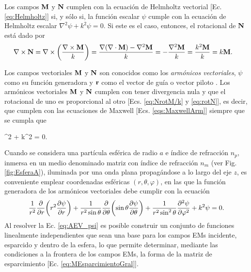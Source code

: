 Los campos $\vb{M}$ y $\vb{N}$ cumplen con la  ecuación de Helmholtz vectorial [Ec. \eqref{eq:Helmholtz}] si, y sólo si, la función escalar $\psi$ cumple con la ecuación de Helmholtz escalar $\nabla^2 \psi + k^2 \psi = 0$. Si este es el caso, entonces, el rotacional de $\vb{N}$ está dado por
	\begin{align}
	\nabla\times \vb{N} &= \nabla\times \qty(\frac{\nabla\times \vb{M}}{k})  
						= \frac{\nabla\qty(\nabla\cdot\vb{M})-\nabla^2\vb{M}}{k}
						= - \frac{\nabla^2 \vb{M}}{k}
						= \frac{k^2 \vb{M}}{k}
						= k \vb{M}.\label{eq:rotN}
	\end{align}\vspace*{-1em}
	
Los campos vectoriales $\vb{M}$ y $\vb{N}$ son conocidos como los \emph{armónicos  vectoriales}, $\psi$ como su función generadora y $\vb{r}$ como el vector de guía o vector piloto \cite{bohren1998absorption}. Los armónicos vectoriales $\vb{M}$ y $\vb{N}$  cumplen con tener divergencia nula y que el rotacional de uno es proporcional al otro [Ecs. \eqref{eq:NrotM/k} y \eqref{eq:rotN}], es decir, que cumplen con las ecuaciones de Maxwell [Ecs. \eqref{eqs:MaxwellArm}] siempre que se cumpla que
	\begin{tcolorbox}[title = $\mathbf{\psi}$: Función generadora de los armónicos  vectoriales, ams align ]
	\nabla^2 \psi + k^2 \psi  = 0.\label{eq:AV_psi}
	\end{tcolorbox}

Cuando se considera una partícula esférica de radio $a$ e índice de refracción $n_p$, inmersa en un medio denominado matriz con índice de refracción $n_m$ (ver Fig. \ref{fig:EsferaA}), iluminada por una onda plana propagándose a lo largo del eje $z$, es conveniente emplear coordenadas esféricas $(r, \theta, \varphi)$, en las que la función generadora de los armónicos vectoriales debe cumplir con la ecuación 
	\begin{align}
	\frac{1}{r^2} \pdv{r}\qty(r^2\pdv{\psi}{r})+ 
	\frac{1}{r^2\sin\theta}\pdv{\theta}\qty(\sin\theta\pdv{\psi}{\theta})
	 + \frac{1}{r^2\sin^2\theta}\pdv[2]{\psi}{\varphi} + k^2 \psi =0. \label{eq:AEV_psi}
	\end{align}
Al resolver la Ec. \eqref{eq:AEV_psi} es posible construir un conjunto de funciones linealmente independientes que sean una base para los campos EMs incidente, esparcido y dentro de la esfera, lo que permite determinar, mediante las condiciones a la frontera de los campos EMs, la forma de la matriz de esparcimiento [Ec. \eqref{eq:MEsparcimientoGral}].

